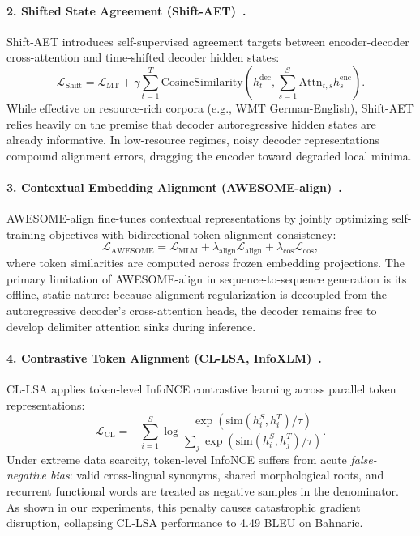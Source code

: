 \documentclass[11pt]{article}
\begin{document}
\paragraph{2. Shifted State Agreement (Shift-AET)~\cite{chen2020accurate}.}
Shift-AET introduces self-supervised agreement targets between encoder-decoder cross-attention and time-shifted decoder hidden states:
\begin{equation}
    \mathcal{L}_{\text{Shift}} = \mathcal{L}_{\text{MT}} + \gamma \sum_{t=1}^T \text{CosineSimilarity}\left(h_t^{\text{dec}}, \sum_{s=1}^S \text{Attn}_{t,s} h_s^{\text{enc}}\right).
\end{equation}
While effective on resource-rich corpora (e.g., WMT German-English), Shift-AET relies heavily on the premise that decoder autoregressive hidden states are already informative. In low-resource regimes, noisy decoder representations compound alignment errors, dragging the encoder toward degraded local minima.

\paragraph{3. Contextual Embedding Alignment (AWESOME-align)~\cite{dou2021word}.}
AWESOME-align fine-tunes contextual representations by jointly optimizing self-training objectives with bidirectional token alignment consistency:
\begin{equation}
    \mathcal{L}_{\text{AWESOME}} = \mathcal{L}_{\text{MLM}} + \lambda_{\text{align}} \mathcal{L}_{\text{align}} + \lambda_{\text{cos}} \mathcal{L}_{\text{cos}},
\end{equation}
where token similarities are computed across frozen embedding projections. The primary limitation of AWESOME-align in sequence-to-sequence generation is its offline, static nature: because alignment regularization is decoupled from the autoregressive decoder's cross-attention heads, the decoder remains free to develop delimiter attention sinks during inference.

\paragraph{4. Contrastive Token Alignment (CL-LSA, InfoXLM)~\cite{chi2021infoxlm}.}
CL-LSA applies token-level InfoNCE contrastive learning across parallel token representations:
\begin{equation}
    \mathcal{L}_{\text{CL}} = -\sum_{i=1}^S \log \frac{\exp\left(\text{sim}(h_i^S, h_i^T)/\tau\right)}{\sum_{j} \exp\left(\text{sim}(h_i^S, h_j^T)/\tau\right)}.
\end{equation}
Under extreme data scarcity, token-level InfoNCE suffers from acute \textit{false-negative bias}: valid cross-lingual synonyms, shared morphological roots, and recurrent functional words are treated as negative samples in the denominator. As shown in our experiments, this penalty causes catastrophic gradient disruption, collapsing CL-LSA performance to 4.49 BLEU on Bahnaric.
\end{document}

